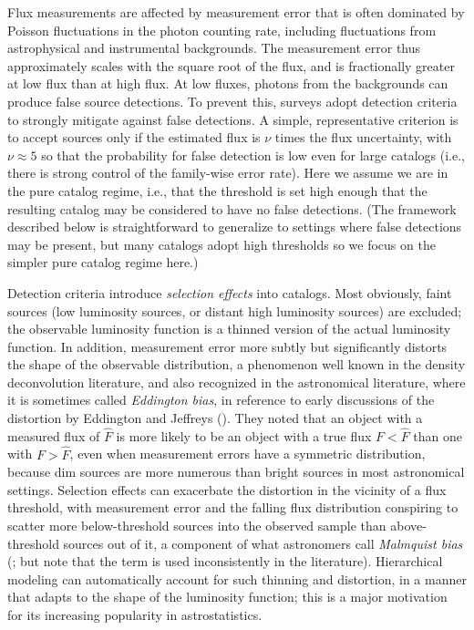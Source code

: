 Flux measurements are affected by measurement error that is often dominated by Poisson fluctuations in the photon counting rate, including fluctuations from astrophysical and instrumental backgrounds.
The measurement error thus approximately scales with the square root of the flux, and is fractionally greater at low flux than at high flux.
At low fluxes, photons from the backgrounds can produce false source detections.
To prevent this, surveys adopt detection criteria to strongly mitigate against false detections.
A simple, representative criterion is to accept sources only if the estimated flux is $\nu$ times the flux uncertainty, with $\nu \approx 5$ so that the probability for false detection is low even for large catalogs (i.e., there is strong control of the family-wise error rate).
Here we assume we are in the pure catalog regime, i.e., that the threshold is set high enough that the resulting catalog may be considered to have no false detections.
(The framework described below is straightforward to generalize to settings where false detections may be present, but many catalogs adopt high thresholds so we focus on the simpler pure catalog regime here.)

Detection criteria introduce \emph{selection effects} into catalogs.
Most obviously, faint sources (low luminosity sources, or distant high luminosity sources) are excluded; the observable luminosity function is a thinned version of the actual luminosity function.
In addition, measurement error more subtly but significantly distorts the shape of the observable distribution, a phenomenon well known in the density deconvolution literature, and also recognized in the astronomical literature, where it is sometimes called \emph{Eddington bias}, in reference to early discussions of the distortion by Eddington and Jeffreys (\citealt{J38-EddBias,E40-EddBias}).
They noted that an object with a measured flux of $\hat F$ is more likely to be an object with a true flux $F < \hat F$ than one with $F > \hat F$, even when measurement errors have a symmetric distribution, because dim sources are more numerous than bright sources in most astronomical settings.
Selection effects can exacerbate the distortion in the vicinity of a flux threshold, with measurement error and the falling flux distribution conspiring to scatter more below-threshold sources into the observed sample than above-threshold sources out of it, a component of what astronomers call \emph{Malmquist bias} (\citealt{LH10-BMIC}; but note that the term is used inconsistently in the literature).
Hierarchical modeling can automatically account for such thinning and distortion, in a manner that adapts to the shape of the luminosity function; this is a major motivation for its increasing popularity in astrostatistics.

